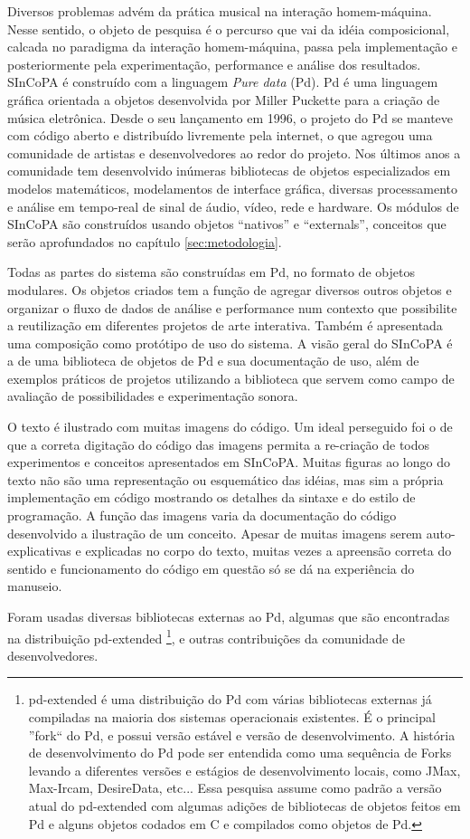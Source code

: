 \documentclass{ppgmus}
\newcommand{\pd}{Pd}
\begin{document}
Diversos problemas advém da prática
musical na interação homem-máquina. Nesse sentido, o 
objeto de pesquisa é o percurso que vai da idéia composicional, calcada
no paradigma da interação homem-máquina,  passa pela implementação
e posteriormente pela experimentação, performance e análise dos resultados.
SInCoPA é construído com a linguagem \textit{Pure data} (\pd). 
Pd \cite{pd:96} é uma linguagem gráfica orientada a objetos desenvolvida por Miller Puckette
para a criação de música eletrônica. Desde o seu lançamento em 1996, o projeto do Pd se manteve
com código aberto e distribuído livremente pela internet, o que agregou uma comunidade de 
artistas e desenvolvedores ao redor do projeto.
Nos últimos anos a comunidade tem desenvolvido inúmeras bibliotecas de objetos especializados em modelos matemáticos, modelamentos de interface gráfica, diversas 
processamento e análise em tempo-real de sinal de áudio, vídeo, rede e hardware. 
Os módulos de SInCoPA são construídos usando objetos ``nativos'' e ``externals'', 
conceitos que serão aprofundados no capítulo \ref{sec:metodologia}. 

Todas as partes do sistema são construídas em Pd, no formato de objetos
modulares. Os objetos criados tem a função de agregar diversos outros objetos e organizar o fluxo de dados
de análise e performance num contexto que possibilite a reutilização em diferentes projetos de arte interativa.
Também é apresentada uma composição como protótipo de uso do sistema. A visão geral do
SInCoPA é a de uma biblioteca de objetos de Pd e sua documentação de uso, 
além de exemplos práticos de projetos
utilizando a biblioteca que servem como campo de avaliação de possibilidades e experimentação sonora.


O texto é ilustrado com muitas imagens do código. Um ideal perseguido foi o de que a correta
digitação do código das imagens permita a re-criação de todos experimentos e conceitos apresentados
em SInCoPA. Muitas figuras ao longo do texto não são uma representação ou esquemático das idéias, mas sim a própria
implementação em código mostrando os detalhes da sintaxe e do estilo de programação.
A função das imagens varia da documentação do código desenvolvido a ilustração de um conceito.
Apesar de muitas imagens serem auto-explicativas e explicadas no corpo do texto, muitas vezes a apreensão 
correta do sentido e funcionamento do código em questão só se dá na experiência do manuseio. 


Foram usadas diversas bibliotecas externas ao Pd, algumas que são encontradas na distribuição pd-extended
\footnote{pd-extended é uma distribuição do Pd com várias bibliotecas externas já compiladas na maioria dos
sistemas operacionais existentes. É o principal ''fork`` do Pd, e possui versão estável e versão de desenvolvimento.
A história de desenvolvimento do Pd pode ser entendida como uma sequência de Forks levando a diferentes versões 
e estágios de desenvolvimento locais, como JMax, Max-Ircam, DesireData, etc... Essa pesquisa assume como padrão
a versão atual do pd-extended com algumas adições de bibliotecas de objetos feitos em Pd e alguns objetos codados
em C e compilados como objetos de Pd.}, 
e outras contribuições da comunidade de desenvolvedores.
\end{document}
